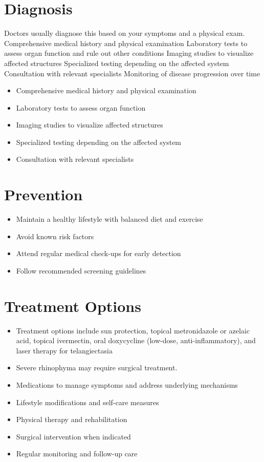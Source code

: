 \section{Diagnosis}
Doctors usually diagnose this based on your symptoms and a physical exam. Comprehensive medical history and physical examination Laboratory tests to assess organ function and rule out other conditions Imaging studies to visualize affected structures Specialized testing depending on the affected system Consultation with relevant specialists Monitoring of disease progression over time

\begin{itemize}[noitemsep]
  \item Comprehensive medical history and physical examination
  \item Laboratory tests to assess organ function
  \item Imaging studies to visualize affected structures
  \item Specialized testing depending on the affected system
  \item Consultation with relevant specialists
\end{itemize}
\section{Prevention}
\begin{itemize}[noitemsep]
  \item Maintain a healthy lifestyle with balanced diet and exercise
  \item Avoid known risk factors
  \item Attend regular medical check-ups for early detection
  \item Follow recommended screening guidelines
\end{itemize}
\section{Treatment Options}
\begin{itemize}[noitemsep]
  \item Treatment options include sun protection, topical metronidazole or azelaic acid, topical ivermectin, oral doxycycline (low-dose, anti-inflammatory), and laser therapy for telangiectasia
  \item Severe rhinophyma may require surgical treatment.
  \item Medications to manage symptoms and address underlying mechanisms
  \item Lifestyle modifications and self-care measures
  \item Physical therapy and rehabilitation
  \item Surgical intervention when indicated
  \item Regular monitoring and follow-up care
\end{itemize}
